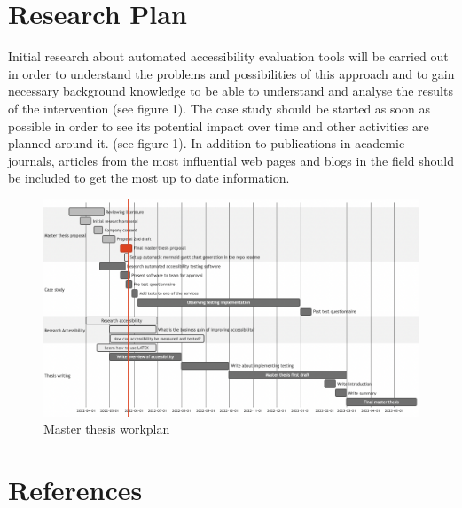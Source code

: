 \documentclass{thesis_proposal}
\begin{document}
\section{Research Plan}
Initial research about automated accessibility evaluation tools will be carried out in order to understand the problems and possibilities of this approach and to gain necessary background knowledge to be able to understand and analyse the results of the intervention (see figure 1).
The case study should be started as soon as possible in order to see its potential impact over time and other activities are planned around it.  (see figure 1).
In addition to publications in academic journals, articles from the most influential web pages and blogs in the field should be included to get the most up to date information.

\begin{figure}[ht!]
    \includegraphics[width=1\textwidth]{img/mermaid_gantt.png}
    \caption{Master thesis workplan}
\end{figure}

\section{References}
\end{document}
